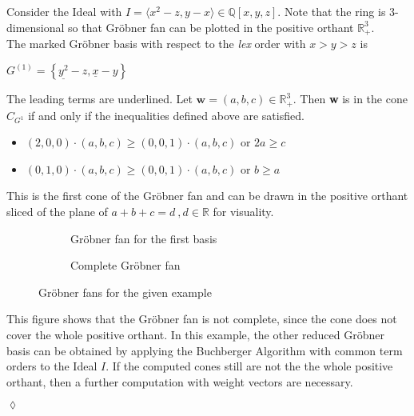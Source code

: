 \begin{env_example}\normalfont
Consider the Ideal with $ I = \langle x^{2}-z,y-x \rangle \in \mathbb{Q}\left[ x,y,z\right] .$
Note that the ring is 3-dimensional so that Gröbner fan can be plotted in the positive orthant $ \mathbb{R}^{3}_{+}$. \\
The marked Gröbner basis with respect to the \textit{lex} order with $x>y>z$ is
\begin{center}
$G^{\left( 1\right) } = \left\lbrace \underline{y^{2}}-z,\underline{x} -y\right\rbrace $
\end{center}
The leading terms are underlined. Let $\textbf{w} = \left( a,b,c\right) \in \mathbb{R}^{3}_{+} $. Then \textbf{w} is in the cone $C_{G^{1}}$ if and only if the inequalities defined above are satisfied.

\begin{itemize}

\item
$\left( 2,0,0\right) \cdot \left( a,b,c\right) \geq \left( 0,0,1\right) \cdot \left( a,b,c\right) $ or $2a\geq c$ 
\item
$\left( 0,1,0\right) \cdot \left( a,b,c\right) \geq \left( 0,0,1\right) \cdot \left( a,b,c\right) $ or $b\geq a$ 

\end{itemize} 

This is the first cone of the Gröbner fan and can be drawn in the positive orthant sliced of the plane of $a+b+c=d~,d\in \mathbb{R}$ for visuality.


\begin{figure}
    \centering
    \begin{subfigure}[b]{0.48\linewidth}        %
        \centering
        
        \caption{Gröbner fan for the first basis}
        \label{fig:singlegroebner}
    \end{subfigure}
    \begin{subfigure}[b]{0.48\linewidth}        %
        \centering
        
        \caption{Complete Gröbner fan}
        \label{fig:completegroebner}
    \end{subfigure}
    \caption{Gröbner fans for the given example}
    \label{fig:groebnerfans}
\end{figure}




This figure shows that the Gröbner fan is not complete, since the cone does not cover the whole positive orthant. In this example, the other reduced Gröbner basis can be obtained by applying the Buchberger Algorithm with common term orders to the Ideal $I$.
If the computed cones still are not the the whole positive orthant, then a further computation with weight vectors are necessary.

\begin{flushright}
$\lozenge$
\end{flushright} 
\end{env_example}

